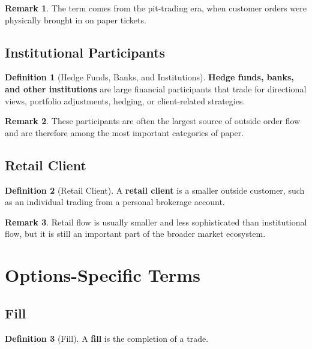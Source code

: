 \documentclass[11pt]{article}
\theoremstyle{definition}
\newtheorem{definition}{Definition}[section]
\newtheorem{remark}{Remark}[section]
\begin{document}
\begin{remark}
The term comes from the pit-trading era, when customer orders were physically brought in on paper tickets.
\end{remark}

\subsection{Institutional Participants}

\begin{definition}[Hedge Funds, Banks, and Institutions]
\textbf{Hedge funds, banks, and other institutions} are large financial participants that trade for directional views, portfolio adjustments, hedging, or client-related strategies.
\end{definition}

\begin{remark}
These participants are often the largest source of outside order flow and are therefore among the most important categories of paper.
\end{remark}

\subsection{Retail Client}

\begin{definition}[Retail Client]
A \textbf{retail client} is a smaller outside customer, such as an individual trading from a personal brokerage account.
\end{definition}

\begin{remark}
Retail flow is usually smaller and less sophisticated than institutional flow, but it is still an important part of the broader market ecosystem.
\end{remark}

\section{Options-Specific Terms}

\subsection{Fill}

\begin{definition}[Fill]
A \textbf{fill} is the completion of a trade.
\end{definition}
\end{document}
